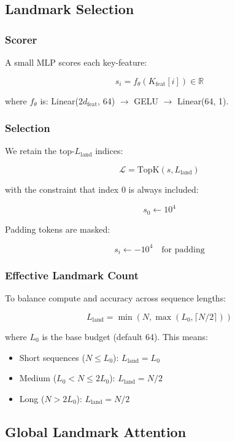 \subsection{Landmark Selection}

\subsubsection{Scorer}

A small MLP scores each key-feature:

\[
s_i = f_\theta(K_\text{feat}[i]) \in \mathbb{R}
\tag{4.2}
\]

where $f_\theta$ is: Linear($2 d_\text{feat}$, 64) $\to$ GELU $\to$ Linear(64, 1).

\subsubsection{Selection}

We retain the top-$L_\text{land}$ indices:

\[
\mathcal{L} = \text{TopK}(s, L_\text{land})
\tag{4.3}
\]

with the constraint that index 0 is always included:

\[
s_0 \leftarrow 10^4
\tag{4.4}
\]

Padding tokens are masked:

\[
s_i \leftarrow -10^4 \quad \text{for padding}
\tag{4.5}
\]

\subsubsection{Effective Landmark Count}

To balance compute and accuracy across sequence lengths:

\[
L_\text{land} = \min(N, \max(L_0, \lceil N/2 \rceil))
\tag{4.6}
\]

where $L_0$ is the base budget (default 64). This means:
\begin{itemize}
\item Short sequences ($N \leq L_0$): $L_\text{land} = L_0$
\item Medium ($L_0 < N \leq 2 L_0$): $L_\text{land} = N/2$
\item Long ($N > 2 L_0$): $L_\text{land} = N/2$

\end{itemize}
\subsection{Global Landmark Attention}

